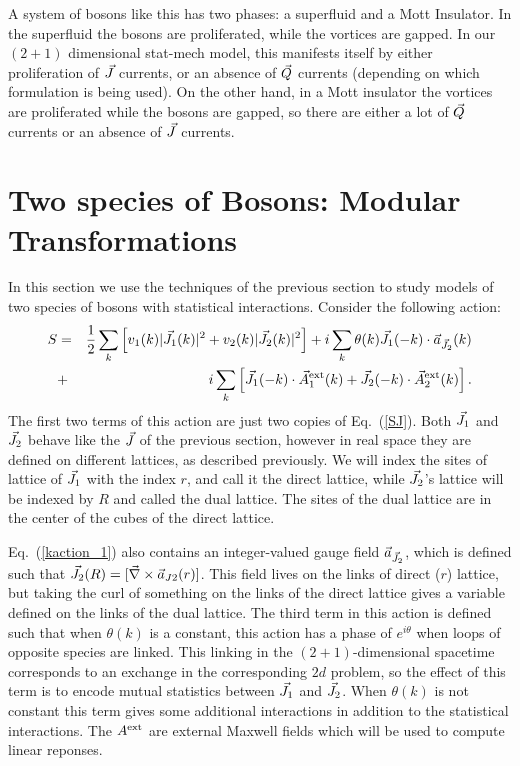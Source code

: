 A system of bosons like this has two phases: a superfluid and a Mott Insulator. In the superfluid the bosons are proliferated, while the vortices are gapped. In our $(2+1)$ dimensional stat-mech model, this manifests itself by either proliferation of $\vec{J}$ currents, or an absence of $\vec{Q}$ currents (depending on which formulation is being used). On the other hand, in a Mott insulator the vortices are proliferated while the bosons are gapped, so there are either a lot of $\vec{Q}$ currents or an absence of $\vec{J}$ currents.

\section{Two species of Bosons: Modular Transformations}
In this section we use the techniques of the previous section to study models of two species of bosons with statistical interactions.\cite{short_range3,Gen2Loops,FQHE} Consider the following action:
\begin{eqnarray}
S&=&\frac{1}{2}\sum_k \left[v_1(k)|\vec{J}_1(k)|^2+v_2(k)|\vec{J}_2(k)|^2\right]
+i\sum_k \theta(k)\vec{J}_1(-k)\cdot \vec{a}_{\vec{J}_2}(k)\nonumber\\
&+&i\sum_k \left[ \vec{J}_1(-k)\cdot \vec{A}_{1}^{\rm ext}(k) + \vec{J}_2(-k)\cdot \vec{A}_{2}^{\rm ext}(k) \right].
\label{kaction_1}
\end{eqnarray}
The first two terms of this action are just two copies of Eq.~(\ref{SJ}). Both $\vec{J}_1$ and $\vec{J}_2$ behave like the $\vec{J}$ of the previous section, however in real space they are defined on different lattices, as described previously. We will index the sites of lattice of $\vec{J}_1$ with the index $r$, and call it the direct lattice, while $\vec{J}_2$'s lattice will be indexed by $R$ and called the dual lattice. The sites of the dual lattice are in the center of the cubes of the direct lattice.

Eq.~(\ref{kaction_1}) also contains an integer-valued gauge field $\vec{a}_{\vec{J}_2}$, which is defined such that $\vec{J}_2(R)=[\vec{\nabla}\times\vec{a}_{J2}(r)]$. This field lives on the links of direct ($r$) lattice, but taking the curl of something on the links of the direct lattice gives a variable defined on the links of the dual lattice. The third term in this action is defined such that when $\theta(k)$ is a constant, this action has a phase of $e^{i\theta}$ when loops of opposite species are linked. This linking in the $(2+1)$-dimensional spacetime corresponds to an exchange in the corresponding $2d$ problem, so the effect of this term is to encode mutual statistics between $\vec{J}_1$ and $\vec{J}_2$. When $\theta(k)$ is not constant this term gives some additional interactions in addition to the statistical interactions. The $A^{\rm ext}$ are external Maxwell fields which will be used to compute linear reponses.

